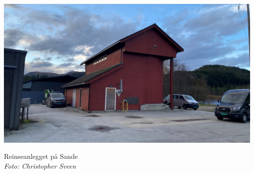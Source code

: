 \chapter*{}
\thispagestyle{romanpages}

\noindent\begin{adjustbox}{center=\paperwidth}
	\hspace*{-0.25\textwidth} %
    \includegraphics[width=1.1\textwidth]{Bilder/Framside RA200.jpg}
\end{adjustbox}

\begin{center}
    Reinseanlegget på Sande \\
    \textit{Foto: Christopher Sveen}
\end{center}
